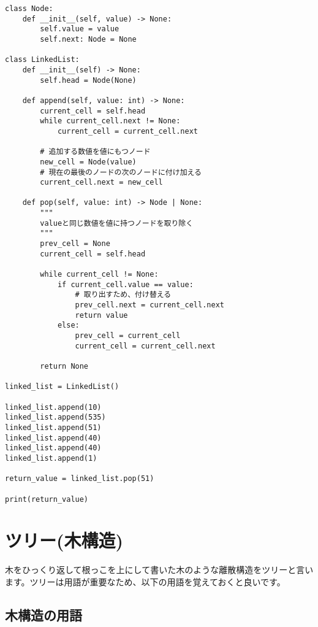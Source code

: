 \documentclass{jlreq}
\begin{document}
\begin{lstlisting}[caption=線形リストの実装, label=linear, frame=TRBL, label={linear}]
class Node:
    def __init__(self, value) -> None:
        self.value = value
        self.next: Node = None
        
class LinkedList:
    def __init__(self) -> None:
        self.head = Node(None)
    
    def append(self, value: int) -> None:
        current_cell = self.head
        while current_cell.next != None:
            current_cell = current_cell.next
        
        # 追加する数値を値にもつノード
        new_cell = Node(value)
        # 現在の最後のノードの次のノードに付け加える
        current_cell.next = new_cell
        
    def pop(self, value: int) -> Node | None:
        """
        valueと同じ数値を値に持つノードを取り除く
        """
        prev_cell = None
        current_cell = self.head
        
        while current_cell != None:
            if current_cell.value == value:
                # 取り出すため、付け替える
                prev_cell.next = current_cell.next
                return value
            else:
                prev_cell = current_cell
                current_cell = current_cell.next
        
        return None

linked_list = LinkedList()

linked_list.append(10)
linked_list.append(535)
linked_list.append(51)
linked_list.append(40)
linked_list.append(40)
linked_list.append(1)

return_value = linked_list.pop(51)

print(return_value)

\end{lstlisting}

\newpage

\section{ツリー(木構造)}
木をひっくり返して根っこを上にして書いた木のような離散構造をツリーと言います。ツリーは用語が重要なため、以下の用語を覚えておくと良いです。

\subsection{木構造の用語}
\end{document}
